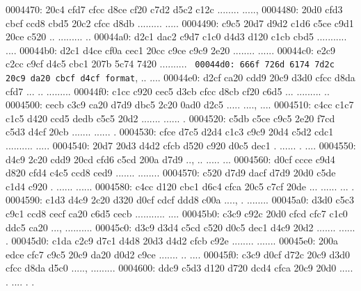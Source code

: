 \begin{bo
00010e0: 7865 647d 5c62 6567 696e 7b76 6572 6261  xed}
\begin{verba
00010f0: 7469 6d7d 0a20 2023 7479 7065 2074 6572  tim}
\begin{
0001c40: 7665 7262 6174 696d 7d0a 2020 236c 6574  verbatim}
\begin{boxe
00027a0: 647d 5c62 6567 696e 7b76 6572 6261 7469  d}
\begin{verbati
00027b0: 6d7d 0a20 2023 6c65 7420 696e 6669 7865  m}
\begin{v
0002c60: 6572 6261 7469 6d7d 0a20 2023 6c65 7420  erbatim}
\begin{
0002dc0: 7665 7262 6174 696d 7d0a 2020 236c 6574  verbatim}
\begin{boxed
0002f30: 7d5c 6265 6769 6e7b 7665 7262 6174 696d  }
\begin{verbatim
0002f40: 7d0a 2020 236c 6574 2068 6428 683a 3a74  }
\begin{v
0003e60: 6572 6261 7469 6d7d 0a20 2023 236f 7065  erbatim}
\begin{boxed
00042b0: 7d5c 6265 6769 6e7b 7665 7262 6174 696d  }
\begin{verbatim
00042c0: 7d0a 2020 2328 782c 7429 3b3b 0a20 202d  }
\begin{boxed}
0004470: 20c4 cfd7 cfcc d8ce cf20 c7d2 d5c2 c12c   ........ .....,
0004480: 20d0 cfd3 cbcf ccd8 cbd5 20c2 cfcc d8db   ......... .....
0004490: c9c5 20d7 d9d2 c1d6 c5ce c9d1 20ce c520  .. ......... .. 
00044a0: d2c1 dac2 c9d7 c1c0 d4d3 d120 c1cb cbd5  ........... ....
00044b0: d2c1 d4ce cf0a cec1 20cc c9ce c9c9 2e20  ........ ...... 
00044c0: e2c9 c2cc c9cf d4c5 cbc1 207b 5c74 7420  .......... {\tt 
00044d0: 666f 726d 6174 7d2c 20c9 da20 cbcf d4cf  format}, .. ....
00044e0: d2cf ca20 cdd9 20c9 d3d0 cfcc d8da cfd7  ... .. .........
00044f0: c1cc c920 cec5 d3cb cfcc d8cb cf20 c6d5  ... ......... ..
0004500: cecb c3c9 ca20 d7d9 dbc5 2c20 0ad0 d2c5  ..... ...., ....
0004510: c4cc c1c7 c1c5 d420 ccd5 dedb c5c5 20d2  ....... ...... .
0004520: c5db c5ce c9c5 2e20 f7cd c5d3 d4cf 20cb  ....... ...... .
0004530: cfce d7c5 d2d4 c1c3 c9c9 20d4 c5d2 cdc1  .......... .....
0004540: 20d7 20d3 d4d2 cfcb d520 c920 d0c5 dec1   . ...... . ....
0004550: d4c9 2c20 cdd9 20cd cfd6 c5cd 200a d7d9  .., .. ..... ...
0004560: d0cf ccce c9d4 d820 cfd4 c4c5 ccd8 ced9  ....... ........
0004570: c520 d7d9 dacf d7d9 20d0 c5de c1d4 c920  . ...... ...... 
0004580: c4cc d120 cbc1 d6c4 cfca 20c5 c7cf 20de  ... ...... ... .
0004590: c1d3 d4c9 2c20 d320 d0cf cdcf ddd8 c00a  ...., . ........
00045a0: d3d0 c5c3 c9c1 ccd8 cecf ca20 c6d5 cecb  ........... ....
00045b0: c3c9 c92c 20d0 cfcd cfc7 c1c0 ddc5 ca20  ..., .......... 
00045c0: d3c9 d3d4 c5cd c520 d0c5 dec1 d4c9 20d2  ....... ...... .
00045d0: c1da c2c9 d7c1 d4d8 20d3 d4d2 cfcb c92e  ........ .......
00045e0: 200a edce cfc7 c9c5 20c9 da20 d0d2 c9ce   ....... .. ....
00045f0: c3c9 d0cf d72c 20c9 d3d0 cfcc d8da d5c0  ....., .........
0004600: ddc9 c5d3 d120 d720 dcd4 cfca 20c9 20d0  ..... . .... . .

\end{boxed}
\end{verbatim
00042c0: 7d0a 2020 2328 782c 7429 3b3b 0a20 202d  }
\end{boxed
00042b0: 7d5c 6265 6769 6e7b 7665 7262 6174 696d  }
\end{v
0003e60: 6572 6261 7469 6d7d 0a20 2023 236f 7065  erbatim}
\end{verbatim
0002f40: 7d0a 2020 236c 6574 2068 6428 683a 3a74  }
\end{boxed
0002f30: 7d5c 6265 6769 6e7b 7665 7262 6174 696d  }
\end{
0002dc0: 7665 7262 6174 696d 7d0a 2020 236c 6574  verbatim}
\end{v
0002c60: 6572 6261 7469 6d7d 0a20 2023 6c65 7420  erbatim}
\end{verbati
00027b0: 6d7d 0a20 2023 6c65 7420 696e 6669 7865  m}
\end{boxe
00027a0: 647d 5c62 6567 696e 7b76 6572 6261 7469  d}
\end{
0001c40: 7665 7262 6174 696d 7d0a 2020 236c 6574  verbatim}
\end{verba
00010f0: 7469 6d7d 0a20 2023 7479 7065 2074 6572  tim}
\end{bo
00010e0: 7865 647d 5c62 6567 696e 7b76 6572 6261  xed}
